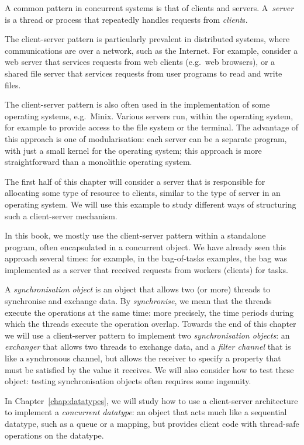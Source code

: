 A common pattern in concurrent systems is that of clients and servers.
A~\emph{server} is a thread or process that repeatedly handles requests from
\emph{client}s.

The client-server pattern is particularly prevalent in distributed systems,
where communications are over a network, such as the Internet.  For example,
consider a web server that services requests from web clients (e.g.~web
browsers), or a shared file server that services requests from user programs
to read and write files.

The client-server pattern is also often used in the implementation of some
operating systems, e.g.~Minix.  Various servers run, within the operating
system, for example to provide access to the file system or the terminal.  The
advantage of this approach is one of modularisation: each server can be a
separate program, with just a small kernel for  the operating system; this
approach is more straightforward than a monolithic operating system.  

The first half of this chapter will consider a server that is responsible for
allocating some type of resource to clients, similar to the type of server in
an operating system.  We will use this example to study different ways of
structuring such a client-server mechanism.

In this book, we mostly use the client-server pattern within a standalone
program, often encapsulated in a concurrent object.  We have already seen this
approach several times: for example, in the bag-of-tasks examples, the bag was
implemented as a server that received requests from workers (clients) for
tasks.
 
A \emph{synchronisation object} is an object that allows two (or more) threads
to synchronise and exchange data.  By \emph{synchronise}, we mean that the
threads execute the operations at the same time: more precisely, the time
periods during which the threads execute the operation overlap.
%
Towards the end of this chapter we will use
a client-server pattern to implement two \emph{synchronisation objects}: an
\emph{exchanger} that allows two threads to exchange data, and a \emph{filter
  channel} that is like a synchronous channel, but allows the receiver to
specify a property that must be satisfied by the value it receives.  We will
also consider how to test these object: testing synchronisation objects often
requires some ingenuity.    

In Chapter~\ref{chap:datatypes}, we will study how to use a client-server
architecture to implement a \emph{concurrent datatype}: an object that acts
much like a sequential datatype, such as a queue or a mapping, but provides
client code with thread-safe operations on the datatype. 

